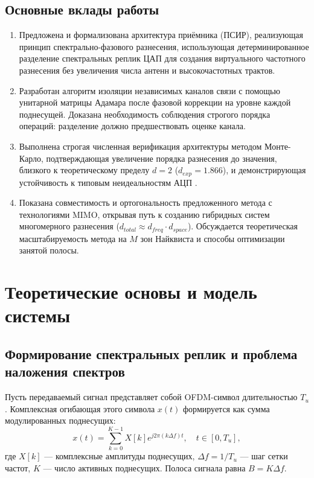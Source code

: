 \documentclass[a4paper,12pt]{article}
\numberwithin{equation}{section}
\begin{document}
\subsection{Основные вклады работы}
\begin{enumerate}
    \item Предложена и формализована архитектура приёмника (ПСИР), реализующая принцип спектрально-фазового разнесения, использующая детерминированное разделение спектральных реплик ЦАП для создания виртуального частотного разнесения без увеличения числа антенн и высокочастотных трактов.
    \item Разработан алгоритм изоляции независимых каналов связи с помощью унитарной матрицы Адамара после фазовой коррекции на уровне каждой поднесущей. Доказана необходимость соблюдения строгого порядка операций: разделение должно предшествовать оценке канала.
    \item Выполнена строгая численная верификация архитектуры методом Монте-Карло, подтверждающая увеличение порядка разнесения до значения, близкого к теоретическому пределу $d=2$ ($d_{exp}=1.866$), и демонстрирующая устойчивость к типовым неидеальностям АЦП \cite{ieee_std,adi_mt008}.
    \item Показана совместимость и ортогональность предложенного метода с технологиями MIMO, открывая путь к созданию гибридных систем многомерного разнесения ($d_{total} \approx d_{freq} \cdot d_{space}$). Обсуждается теоретическая масштабируемость метода на $M$ зон Найквиста и способы оптимизации занятой полосы.
\end{enumerate}

\section{Теоретические основы и модель системы}

\subsection{Формирование спектральных реплик и проблема наложения спектров}

Пусть передаваемый сигнал представляет собой OFDM-символ длительностью $T_u$. Комплексная огибающая этого символа $x(t)$ формируется как сумма модулированных поднесущих:
\begin{equation}
x(t) = \sum_{k=0}^{K-1} X[k] e^{j 2 \pi (k \Delta f) t}, \quad t \in [0, T_u],
\label{eq:ofdm_baseband}
\end{equation}
где $X[k]$ — комплексные амплитуды поднесущих, $\Delta f = 1/T_u$ — шаг сетки частот, $K$ — число активных поднесущих. Полоса сигнала равна $B = K \Delta f$.
\end{document}
